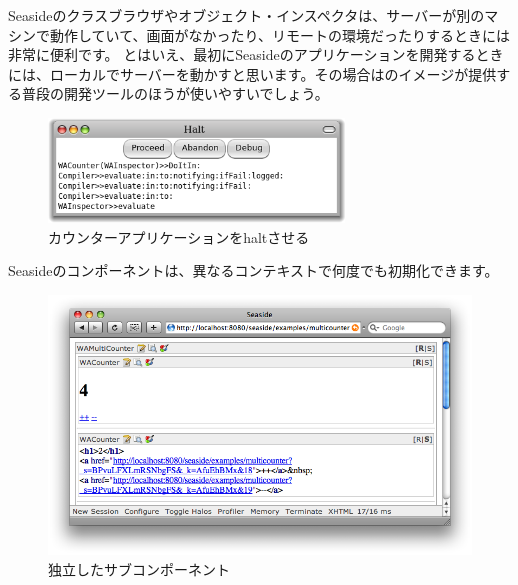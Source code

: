 \documentclass[a4paper,10pt,twoside]{book}
\begin{document}
Seasideのクラスブラウザやオブジェクト・インスペクタは、サーバーが別のマシンで動作していて、画面がなかったり、リモートの環境だったりするときには非常に便利です。
とはいえ、最初にSeasideのアプリケーションを開発するときには、ローカルでサーバーを動かすと思います。その場合は\pharo のイメージが提供する普段の開発ツールのほうが使いやすいでしょう。

\begin{figure}[ht]
\begin{center}
\includegraphics[width=0.7\textwidth]{haltingCounter}
\caption{カウンターアプリケーションをhaltさせる}
\end{center}
\end{figure}


Seasideのコンポーネントは、異なるコンテキストで何度でも初期化できます。

\begin{figure}[ht]
\begin{center}
\includegraphics[width=\textwidth]{multiCounterHalos}
\caption{独立したサブコンポーネント}
\end{center}
\end{figure}
\end{document}
